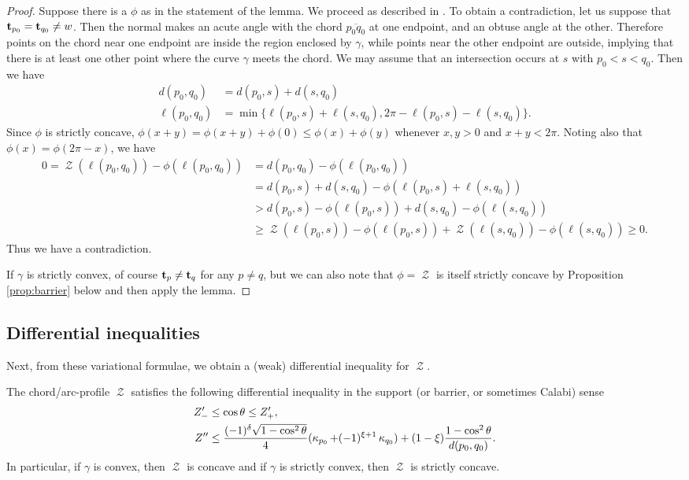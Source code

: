 \documentclass[11pt]{amsart}
\DeclareMathOperator{\chordarcprofile}{\mathcal{Z}}
\begin{document}
\begin{proof}
Suppose there is a $\phi$ as in the statement of the lemma. We proceed as described in \cite{MR2794630}. To obtain a contradiction, let us suppose that $\operatorname{\mathbf{t}}_{p_0} = \operatorname{\mathbf{t}}_{q_0} \ne w$. Then the normal makes an acute angle with the chord $\overline{p_0 q_0}$ at one endpoint, and an obtuse angle at the other. Therefore points on the chord near one endpoint are inside the region enclosed by $\gamma$, while points near the other endpoint are outside, implying that there is at least one other point where the curve $\gamma$ meets the chord. We may assume that an intersection occurs at $s$ with $p_0 < s < q_0$. Then we have
\begin{align*}
d(p_0, q_0) &= d(p_0, s) + d(s, q_0) \\
\ell(p_0, q_0) &= \min\{\ell(p_0, s) + \ell(s, q_0),  2\pi -\ell(p_0,s ) - \ell(s, q_0)\}.
\end{align*}
Since $\phi$ is strictly concave, $\phi(x + y) = \phi(x + y) + \phi(0) \leq \phi(x) + \phi(y)$ whenever $x, y > 0$ and $x + y < 2\pi$. Noting also that $\phi(x) = \phi(2\pi - x)$, we have
\[
\begin{split}
0 = \chordarcprofile(\ell(p_0, q_0)) - \phi(\ell(p_0, q_0)) &=  d(p_0, q_0) - \phi(\ell(p_0, q_0)) \\
&= d(p_0, s) + d(s, q_0) - \phi(\ell(p_0, s) + \ell(s,  q_0)) \\
&> d(p_0, s) - \phi(\ell(p_0, s)) + d(s, q_0) - \phi(\ell(s, q_0)) \\
&\geq \chordarcprofile(\ell(p_0, s)) - \phi(\ell(p_0, s)) + \chordarcprofile(\ell(s, q_0)) - \phi(\ell(s, q_0)) \geq 0.
\end{split}
\]
Thus we have a contradiction. 

If $\gamma$ is strictly convex, of course $\operatorname{\mathbf{t}}_p \ne \operatorname{\mathbf{t}}_q$ for any $p\ne q$, but we can also note that $\phi=\chordarcprofile$ is itself strictly concave by Proposition \ref{prop:barrier} below and then apply the lemma.
\end{proof}

\subsection{Differential inequalities}
\label{sec:orgheadline9}

Next, from these variational formulae, we obtain a (weak) differential inequality for \(\chordarcprofile\).

\begin{prop}
\label{prop:barrier}
The chord/arc-profile $\chordarcprofile$ satisfies the following differential inequality in the support (or barrier, or sometimes Calabi) sense
\begin{align*}
Z'_- &\leq \cos\theta \leq Z'_+, \\
Z'' &\leq \frac{(-1)^{\delta}\sqrt{1-\cos^2\theta}}{4} (\operatorname{\kappa}_{p_0} + (-1)^{\xi+1}\operatorname{\kappa}_{q_0}) + (1-\xi) \frac{1-\cos^2\theta}{d(p_0,q_0)}.
\end{align*}
In particular, if $\gamma$ is convex, then $\chordarcprofile$ is concave and if $\gamma$ is strictly convex, then $\chordarcprofile$ is strictly concave.
\end{prop}
\end{document}
